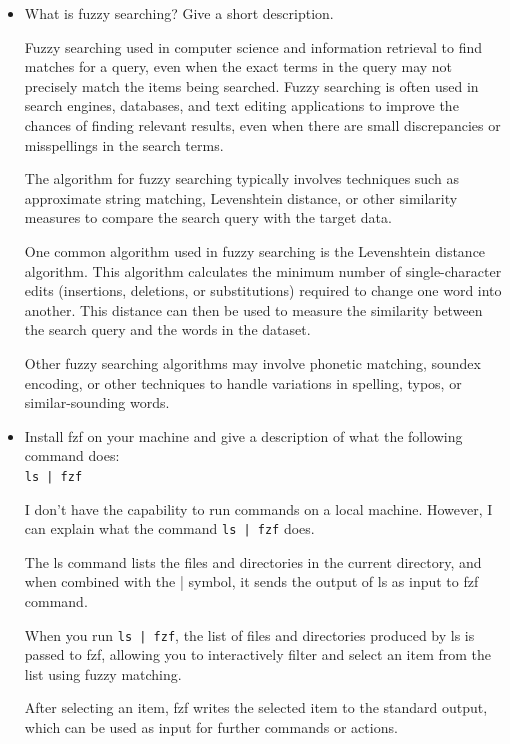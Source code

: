 \documentclass[titlepage]{article}
\begin{document}
	\begin{itemize}
		\item What is fuzzy searching? Give a short description.
		
		Fuzzy searching used in computer science and information retrieval to find matches for a query, even when the exact terms in the query may not precisely match the items being searched. Fuzzy searching is often used in search engines, databases, and text editing applications to improve the chances of finding relevant results, even when there are small discrepancies or misspellings in the search terms.
		
		The algorithm for fuzzy searching typically involves techniques such as approximate string matching, Levenshtein distance, or other similarity measures to compare the search query with the target data.
		
		One common algorithm used in fuzzy searching is the Levenshtein distance algorithm. This algorithm calculates the minimum number of single-character edits (insertions, deletions, or substitutions) required to change one word into another. This distance can then be used to measure the similarity between the search query and the words in the dataset.
		
		Other fuzzy searching algorithms may involve phonetic matching, soundex encoding, or other techniques to handle variations in spelling, typos, or similar-sounding words.
		
		
		\item Install fzf on your machine and give a description of what the following command does:\\
		\texttt{ls | fzf}
		
		I don't have the capability to run commands on a local machine. However, I can explain what the command \texttt{ls | fzf} does.
		
		The ls command lists the files and directories in the current directory, and when combined with the | symbol, it sends the output of ls as input to fzf command.
		
		When you run \texttt{ls | fzf}, the list of files and directories produced by ls is passed to fzf, allowing you to interactively filter and select an item from the list using fuzzy matching.
		
		After selecting an item, fzf writes the selected item to the standard output, which can be used as input for further commands or actions.
		
	\end{itemize}
\end{document}
